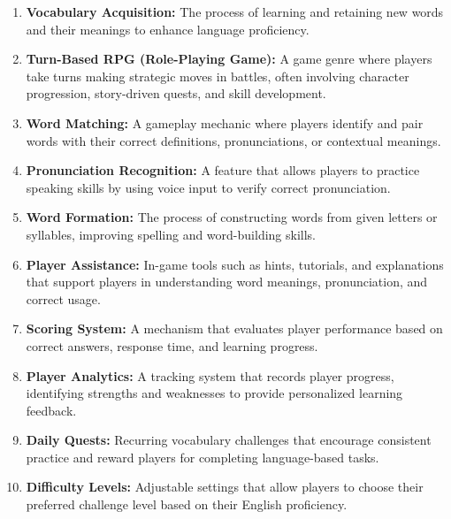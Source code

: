 \begin{enumerate}
    \item \textbf{Vocabulary Acquisition:} The process of learning and retaining new words and their meanings to enhance language proficiency.

    \item \textbf{Turn-Based RPG (Role-Playing Game):} A game genre where players take turns making strategic moves in battles, often involving character progression, story-driven quests, and skill development.

    \item \textbf{Word Matching:} A gameplay mechanic where players identify and pair words with their correct definitions, pronunciations, or contextual meanings.

    \item \textbf{Pronunciation Recognition:} A feature that allows players to practice speaking skills by using voice input to verify correct pronunciation.

    \item \textbf{Word Formation:} The process of constructing words from given letters or syllables, improving spelling and word-building skills.

    \item \textbf{Player Assistance:} In-game tools such as hints, tutorials, and explanations that support players in understanding word meanings, pronunciation, and correct usage.

    \item \textbf{Scoring System:} A mechanism that evaluates player performance based on correct answers, response time, and learning progress.

    \item \textbf{Player Analytics:} A tracking system that records player progress, identifying strengths and weaknesses to provide personalized learning feedback.

    \item \textbf{Daily Quests:} Recurring vocabulary challenges that encourage consistent practice and reward players for completing language-based tasks.

    \item \textbf{Difficulty Levels:} Adjustable settings that allow players to choose their preferred challenge level based on their English proficiency.
\end{enumerate}

